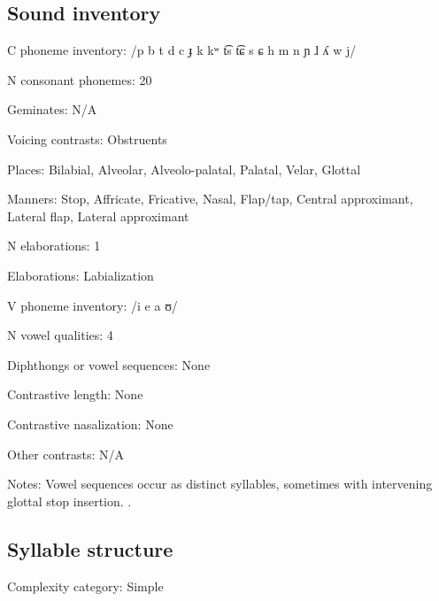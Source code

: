 {\subsection*{Sound inventory}
\begin{appendixdesc}

\item[C phoneme inventory:] /p b t d c ɟ k kʷ t͡s t͡ɕ s ɕ h m n ɲ ɺ ʎ w j/

\item[N consonant phonemes:] 20

\item[Geminates:] N/A

\item[Voicing contrasts:] Obstruents

\item[Places:] Bilabial, Alveolar, Alveolo-palatal, Palatal, Velar, Glottal

\item[Manners:] Stop, Affricate, Fricative, Nasal, Flap/tap, Central approximant, Lateral flap, Lateral approximant

\item[N elaborations:] 1

\item[Elaborations:] Labialization

\item[V phoneme inventory:] /i e a ʊ/

\item[N vowel qualities:] 4

\item[Diphthongs or vowel sequences:] None

\item[Contrastive length:] None

\item[Contrastive nasalization:] None

\item[Other contrasts:] N/A

\item[Notes:] Vowel sequences occur as distinct syllables, sometimes with intervening glottal stop insertion. \citep[28--29]{Guillaume2008}.
\end{appendixdesc}
\subsection*{Syllable structure}
\begin{appendixdesc}

\item[Complexity category:] Simple


\end{appendixdesc}}
